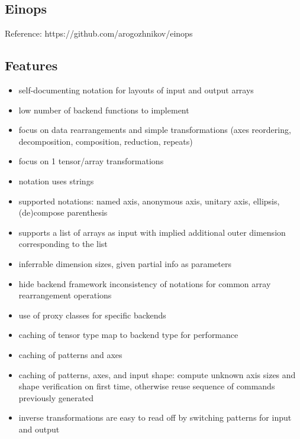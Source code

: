 \documentclass[8pt,letter]{article}
\begin{document}


\begin{multicols*}{2}

  \section{Einops}

  Reference: https://github.com/arogozhnikov/einops
  
  \subsection{Features}
  
  \begin{itemize}
  \item self-documenting notation for layouts of input and output arrays
  \item low number of backend functions to implement
  \item focus on data rearrangements and simple transformations (axes reordering, decomposition, composition, reduction, repeats)
  \item focus on 1 tensor/array transformations
  \item notation uses strings
  \item supported notations: named axis, anonymous axis, unitary axis, ellipsis, (de)compose parenthesis
  \item supports a list of arrays as input with implied additional outer dimension corresponding to the list
  \item inferrable dimension sizes, given partial info as parameters
  \item hide backend framework inconsistency of notations for common array rearrangement operations
  \item use of proxy classes for specific backends
  \item caching of tensor type map to backend type for performance
  \item caching of patterns and axes
  \item caching of patterns, axes, and input shape: compute unknown axis sizes and shape verification on first time, otherwise reuse sequence of commands previously generated
  \item inverse transformations are easy to read off by switching patterns for input and output
  \end{itemize}


\end{multicols*}
\end{document}
